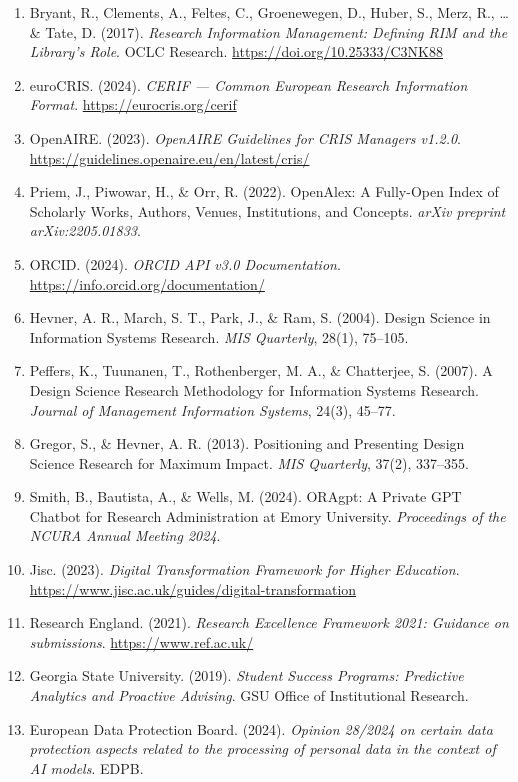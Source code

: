 \begin{enumerate}[leftmargin=*,itemsep=0.4em]
\item Bryant, R., Clements, A., Feltes, C., Groenewegen, D., Huber, S., Merz, R., \ldots{} \& Tate, D. (2017). \textit{Research Information Management: Defining RIM and the Library's Role}. OCLC Research. \url{https://doi.org/10.25333/C3NK88}
\item euroCRIS. (2024). \textit{CERIF --- Common European Research Information Format}. \url{https://eurocris.org/cerif}
\item OpenAIRE. (2023). \textit{OpenAIRE Guidelines for CRIS Managers v1.2.0}. \url{https://guidelines.openaire.eu/en/latest/cris/}
\item Priem, J., Piwowar, H., \& Orr, R. (2022). OpenAlex: A Fully-Open Index of Scholarly Works, Authors, Venues, Institutions, and Concepts. \textit{arXiv preprint arXiv:2205.01833}.
\item ORCID. (2024). \textit{ORCID API v3.0 Documentation}. \url{https://info.orcid.org/documentation/}
\item Hevner, A. R., March, S. T., Park, J., \& Ram, S. (2004). Design Science in Information Systems Research. \textit{MIS Quarterly}, 28(1), 75--105.
\item Peffers, K., Tuunanen, T., Rothenberger, M. A., \& Chatterjee, S. (2007). A Design Science Research Methodology for Information Systems Research. \textit{Journal of Management Information Systems}, 24(3), 45--77.
\item Gregor, S., \& Hevner, A. R. (2013). Positioning and Presenting Design Science Research for Maximum Impact. \textit{MIS Quarterly}, 37(2), 337--355.
\item Smith, B., Bautista, A., \& Wells, M. (2024). ORAgpt: A Private GPT Chatbot for Research Administration at Emory University. \textit{Proceedings of the NCURA Annual Meeting 2024}.
\item Jisc. (2023). \textit{Digital Transformation Framework for Higher Education}. \url{https://www.jisc.ac.uk/guides/digital-transformation}
\item Research England. (2021). \textit{Research Excellence Framework 2021: Guidance on submissions}. \url{https://www.ref.ac.uk/}
\item Georgia State University. (2019). \textit{Student Success Programs: Predictive Analytics and Proactive Advising}. GSU Office of Institutional Research.
\item European Data Protection Board. (2024). \textit{Opinion 28/2024 on certain data protection aspects related to the processing of personal data in the context of AI models}. EDPB.

\end{enumerate}
